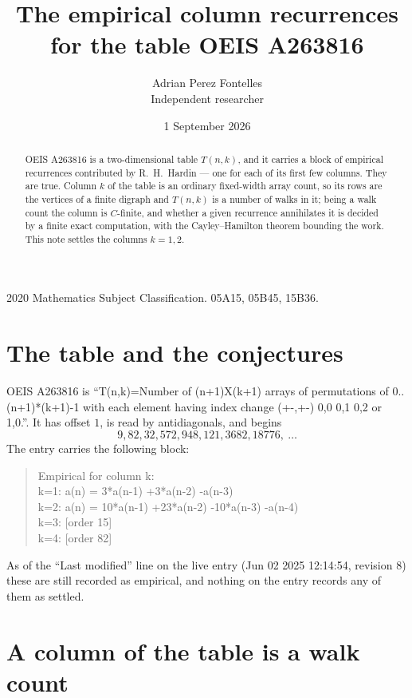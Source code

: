 \documentclass[11pt,a4paper]{article}
\title{The empirical column recurrences for the table OEIS A263816}
\author{Adrian Perez Fontelles\\ \small Independent researcher}
\date{1 September 2026}
\theoremstyle{plain}
\theoremstyle{definition}
\begin{document}
\maketitle

\begin{abstract}
OEIS A263816 is a two-dimensional table $T(n,k)$, and it carries a block of empirical
recurrences contributed by R.~H.~Hardin --- one for each of its first few columns. They are
true. Column $k$ of the table is an ordinary fixed-width array count, so its rows are the
vertices of a finite digraph and $T(n,k)$ is a number of walks in it; being a walk count the
column is $C$-finite, and whether a given recurrence annihilates it is decided by a finite
exact computation, with the Cayley--Hamilton theorem bounding the work. This note settles the columns $k=1, 2$.
\end{abstract}

\noindent\small 2020 Mathematics Subject Classification. 05A15, 05B45, 15B36.\normalsize

\section{The table and the conjectures}

OEIS A263816 is ``T(n,k)=Number of (n+1)X(k+1) arrays of permutations of 0..(n+1)*(k+1)-1 with each element having index change (+-,+-) 0,0 0,1 0,2 or 1,0.''. It has offset $1$, is
read by antidiagonals, and begins
\[
9, 82, 32, 572, 948, 121, 3682, 18776,\ \dots
\]
The entry carries the following block:
\begin{quote}\small
Empirical for column k:\\
k=1: a(n) = 3*a(n-1) +3*a(n-2) -a(n-3)\\
k=2: a(n) = 10*a(n-1) +23*a(n-2) -10*a(n-3) -a(n-4)\\
k=3: [order 15]\\
k=4: [order 82]\\
\end{quote}
As of the ``Last modified'' line on the live entry (Jun 02 2025 12:14:54, revision 8) these are still
recorded as empirical, and nothing on the entry records any of them as settled.

\section{A column of the table is a walk count}
\end{document}
